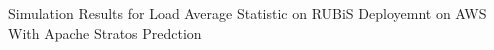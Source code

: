 \label{stratos} Simulation Results for Load Average Statistic on RUBiS Deployemnt on AWS With Apache Stratos Predction